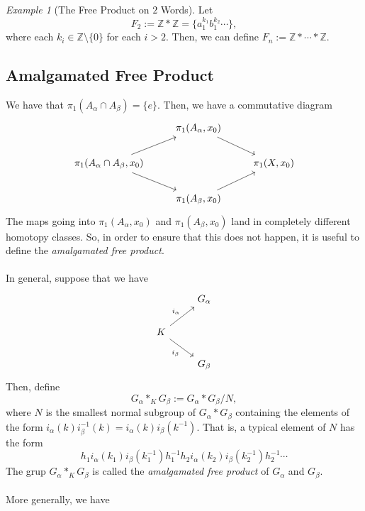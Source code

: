 \documentclass[a4paper]{report}
\theoremstyle{definition}
\theoremstyle{remark}
\theoremstyle{proposition}
\theoremstyle{conjecture}
\theoremstyle{lemma}
\theoremstyle{corollary}
\theoremstyle{exercise}
\newtheorem{example}{Example}
\begin{document}
\begin{example}[The Free Product on $2$ Words]
    Let $$F_2 := \mathbb{Z} \ast \mathbb{Z} = \lbrace a_1^{k_1}b_1^{k_2}\cdots\rbrace,$$
    where each $k_i \in \mathbb{Z}\setminus \lbrace 0 \rbrace$ for each 
    $i > 2$.
    Then, we can define $F_n := \mathbb{Z} \ast \cdots \ast \mathbb{Z}$.
\end{example}

\subsection{Amalgamated Free Product}

We have that 
$\pi_1(A_\alpha \cap A_\beta) = \lbrace e\rbrace$. Then, we have a commutative
diagram $$\begin{tikzcd}
                                                         & {\pi_1(A_\alpha,x_0)} \arrow[rd] &                \\
{\pi_1(A_\alpha \cap A_\beta,x_0)} \arrow[ru] \arrow[rd] &                                  & {\pi_1(X,x_0)} \\
                                                         & {\pi_1(A_\beta,x_0)} \arrow[ru]  &               
\end{tikzcd}$$
The maps going into $\pi_1(A_\alpha,x_0)$ and $\pi_1(A_\beta,x_0)$ land in 
completely different homotopy classes. So, in order to ensure that this does
not happen, it is useful to define the \emph{amalgamated free product}.\\\\
In general, suppose that we have 
$$\begin{tikzcd}
                                                & G_\alpha \\
K \arrow[ru, "i_\alpha"] \arrow[rd, "i_\beta"'] &          \\
                                                & G_\beta 
\end{tikzcd}$$
Then, define 
$$G_\alpha \ast_K G_\beta := G_\alpha \ast G_\beta /N,$$
where $N$ is the smallest normal subgroup of $G_\alpha \ast G_\beta$
containing the elements of the form $i_\alpha(k) i^{-1}_\beta(k) = i_\alpha(k)i_\beta(k^{-1})$. That is, a typical element of $N$ has the form
$$h_1 i_\alpha(k_1) i_\beta(k_1^{-1}) h_1^{-1} h_2i_\alpha(k_2)i_\beta(k_2^{-1})h_2^{-1}\cdots$$
The grup $G_\alpha \ast_K G_\beta$ is called the \emph{amalgamated free product}
of $G_\alpha$ and $G_\beta$.\\\\
More generally, we have
\end{document}
